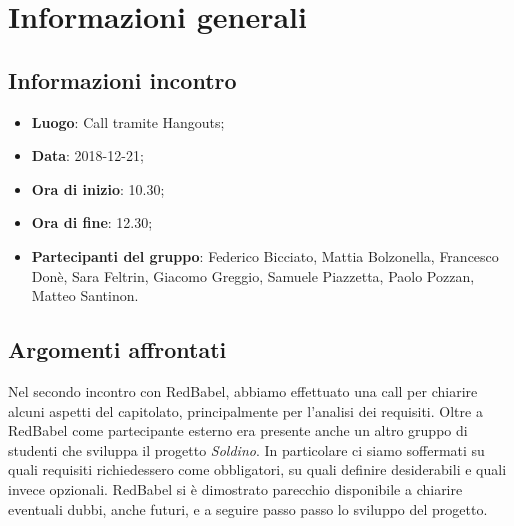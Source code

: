 \section{Informazioni generali}

\subsection{Informazioni incontro}
\begin{itemize}
\item \textbf{Luogo}: Call tramite Hangouts;
\item \textbf{Data}: 2018-12-21;
\item \textbf{Ora di inizio}: 10.30;
\item \textbf{Ora di fine}: 12.30;
\item \textbf{Partecipanti del gruppo}: Federico Bicciato, Mattia Bolzonella, 
Francesco Donè, Sara Feltrin, Giacomo Greggio, Samuele Piazzetta, Paolo Pozzan, 
Matteo Santinon. 
\end{itemize}

\subsection{Argomenti affrontati}
Nel secondo incontro con RedBabel, abbiamo effettuato una call per chiarire alcuni aspetti del capitolato, principalmente per l'analisi dei requisiti.
Oltre a RedBabel come partecipante esterno era presente anche un altro gruppo di studenti che sviluppa il progetto \textit{Soldino}.
In particolare ci siamo soffermati su quali requisiti richiedessero come obbligatori, su quali definire desiderabili e quali invece opzionali.
RedBabel si è dimostrato parecchio disponibile a chiarire eventuali dubbi, anche futuri, e a seguire passo passo lo sviluppo del progetto.
